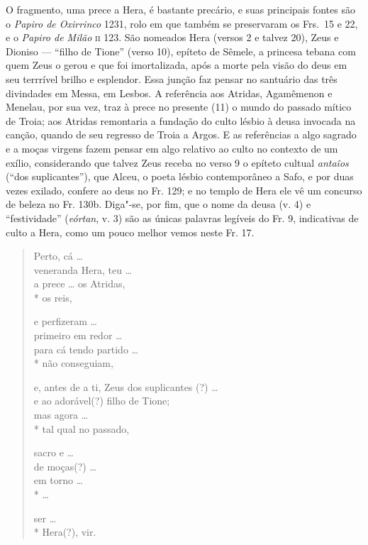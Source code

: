 {{\small O fragmento, uma prece a Hera, é bastante precário, e suas principais fontes são o \textit{Papiro de Oxirrinco} 1231, rolo em que também se preservaram os Frs.~15 e 22, e o \textit{Papiro de Milão} \textsc{ii} 123. São nomeados Hera (versos 2 e talvez 20), Zeus e Dioniso --- ``filho de Tione'' (verso 10), epíteto de Sêmele, a princesa tebana com quem Zeus o gerou e que foi imortalizada, após a morte pela visão do deus em seu terrrível brilho e esplendor. Essa junção faz pensar no santuário das três divindades em Messa, em Lesbos. A referência aos Atridas, Agamêmenon e Menelau, por sua vez, traz à prece no presente (11) o mundo do passado mítico de Troia; aos Atridas remontaria a fundação do culto lésbio à deusa invocada na canção, quando de seu regresso de Troia a Argos. E as referências a algo sagrado e a moças virgens fazem pensar em algo relativo ao culto no contexto de um exílio, considerando que talvez Zeus receba no verso 9 o epíteto cultual \textit{antaîos} (``dos suplicantes''), que Alceu, o poeta lésbio contemporâneo a Safo, e por duas vezes exilado, confere ao deus no Fr. 129; e no templo de Hera ele vê um concurso de beleza no Fr. 130b. Diga"-se, por fim, que o nome da deusa (v. 4) e ``festividade'' (\textit{eórtan}, v. 3) são as únicas palavras legíveis do Fr. 9, indicativas de culto a Hera, como um pouco melhor vemos neste Fr. 17.}

\begin{verse}
Perto, cá \ldots{}\\
veneranda Hera, teu \ldots{}\\
a prece \ldots{} os Atridas,\\*
os reis,

e perfizeram \ldots{}\\
primeiro em redor \ldots{}\\
para cá tendo partido \ldots{}\\*
não conseguiam,

\pagebreak

e, antes de a ti, Zeus dos suplicantes (?) \ldots{}\\
e ao adorável(?) filho de Tione;\\
mas agora \ldots{}\\*
tal qual no passado,

sacro e \ldots{}\\
de moças(?) \ldots{}\\
em torno \ldots{}\\*
\ldots{}

ser \ldots{}\\*
Hera(?), vir.
\end{verse}

}
